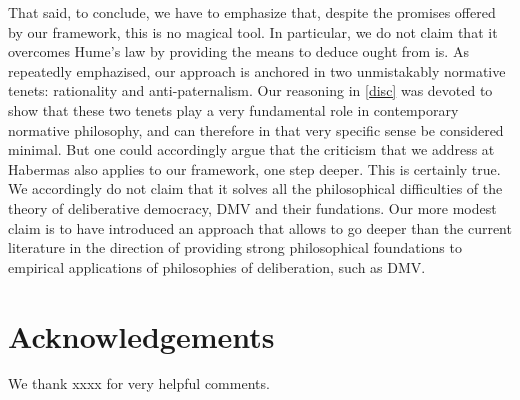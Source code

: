 \documentclass[version=3.21, pagesize, twoside=off, bibliography=totoc, DIV=calc, fontsize=12pt, a4paper, french, english]{scrartcl}
\newenvironment{acknowledgements}{
	\section*{Acknowledgements}
}{
}
\begin{document}
That said, to conclude, we have to emphasize that, despite the promises offered by our framework, this is no magical tool. 
In particular, we do not claim that it overcomes Hume's law by providing the means to deduce ought from is. 
As repeatedly emphazised, our approach is anchored in two unmistakably normative tenets: rationality and anti-paternalism. 
Our reasoning in \cref{disc} was devoted to show that these two tenets play a very fundamental role in contemporary normative philosophy, and can therefore in that very specific sense be considered minimal. 
But one could accordingly argue that the criticism that we address at Habermas also applies to our framework, one step deeper. This is certainly true. 
We accordingly do not claim that it solves all the philosophical difficulties of the theory of deliberative democracy, DMV and their fundations. 
Our more modest claim is to have introduced an approach that allows to go deeper than the current literature in the direction of providing strong philosophical foundations to empirical applications of philosophies of deliberation, such as DMV. 


\begin{acknowledgements}
We thank xxxx for very helpful comments.
\end{acknowledgements}



\end{document}
